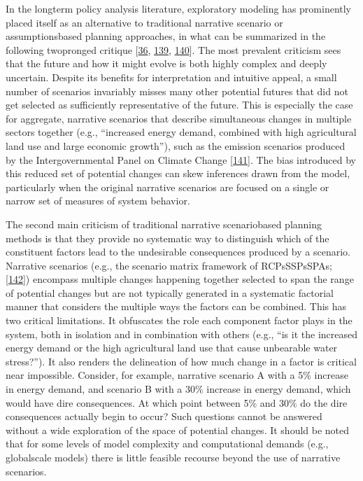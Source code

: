 \documentclass[letterpaper,10pt,english]{sphinxmanual}
\begin{document}
\sphinxAtStartPar
In the long\sphinxhyphen{}term policy analysis literature, exploratory modeling has prominently placed itself as an alternative to traditional narrative scenario or assumptions\sphinxhyphen{}based planning approaches, in what can be summarized in the following two\sphinxhyphen{}pronged critique {[}\hyperlink{cite.index:id15}{36}, \hyperlink{cite.index:id67}{139}, \hyperlink{cite.index:id66}{140}{]}. The most prevalent criticism sees that the future and how it might evolve is both highly complex and deeply uncertain. Despite its benefits for interpretation and intuitive appeal, a small number of scenarios invariably misses many other potential futures that did not get selected as sufficiently representative of the future. This is especially the case for aggregate, narrative scenarios that describe simultaneous changes in multiple sectors together (e.g., “increased energy demand, combined with high agricultural land use and large economic growth”), such as the emission scenarios produced by the Intergovernmental Panel on Climate Change {[}\hyperlink{cite.index:id68}{141}{]}. The bias introduced by this reduced set of potential changes can skew inferences drawn from the model, particularly when the original narrative scenarios are focused on a single or narrow set of measures of system behavior.

\sphinxAtStartPar
The second main criticism of traditional narrative scenario\sphinxhyphen{}based planning methods is that they provide no systematic way to distinguish which of the constituent factors lead to the undesirable consequences produced by a scenario. Narrative scenarios (e.g., the scenario matrix framework of RCPs\sphinxhyphen{}SSPs\sphinxhyphen{}SPAs; {[}\hyperlink{cite.index:id69}{142}{]}) encompass multiple changes happening together selected to span the range of potential changes but are not typically generated in a systematic factorial manner that considers the multiple ways the factors can be combined. This has two critical limitations. It obfuscates the role each component factor plays in the system, both in isolation and in combination with others (e.g., “is it the increased energy demand or the high agricultural land use that cause unbearable water stress?”). It also renders the delineation of how much change in a factor is critical near impossible. Consider, for example, narrative scenario A with a 5\% increase in energy demand, and scenario B with a 30\% increase in energy demand, which would have dire consequences. At which point between 5\% and 30\% do the dire consequences actually begin to occur? Such questions cannot be answered without a wide exploration of the space of potential changes. It should be noted that for some levels of model complexity and computational demands (e.g., global\sphinxhyphen{}scale models) there is little feasible recourse beyond the use of narrative scenarios.
\end{document}
